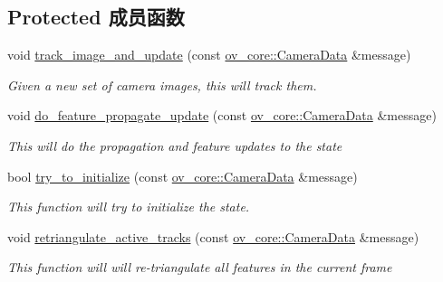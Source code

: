 \subsection*{Protected 成员函数}
\begin{DoxyCompactItemize}
\item 
void \hyperlink{classov__msckf_1_1VioManager_a626bd0d043f80c4d5e993bcfbbee0244}{track\+\_\+image\+\_\+and\+\_\+update} (const \hyperlink{structov__core_1_1CameraData}{ov\+\_\+core\+::\+Camera\+Data} \&message)
\begin{DoxyCompactList}\small\item\em Given a new set of camera images, this will track them. \end{DoxyCompactList}\item 
void \hyperlink{classov__msckf_1_1VioManager_a31d3fade828a229a1b5a99abd9aaa243}{do\+\_\+feature\+\_\+propagate\+\_\+update} (const \hyperlink{structov__core_1_1CameraData}{ov\+\_\+core\+::\+Camera\+Data} \&message)
\begin{DoxyCompactList}\small\item\em This will do the propagation and feature updates to the state \end{DoxyCompactList}\item 
bool \hyperlink{classov__msckf_1_1VioManager_adc329d2be4fad2addd93e01e5318c102}{try\+\_\+to\+\_\+initialize} (const \hyperlink{structov__core_1_1CameraData}{ov\+\_\+core\+::\+Camera\+Data} \&message)
\begin{DoxyCompactList}\small\item\em This function will try to initialize the state. \end{DoxyCompactList}\item 
void \hyperlink{classov__msckf_1_1VioManager_ac3259add6e59f191388dfe989d668759}{retriangulate\+\_\+active\+\_\+tracks} (const \hyperlink{structov__core_1_1CameraData}{ov\+\_\+core\+::\+Camera\+Data} \&message)
\begin{DoxyCompactList}\small\item\em This function will will re-\/triangulate all features in the current frame \end{DoxyCompactList}\end{DoxyCompactItemize}
